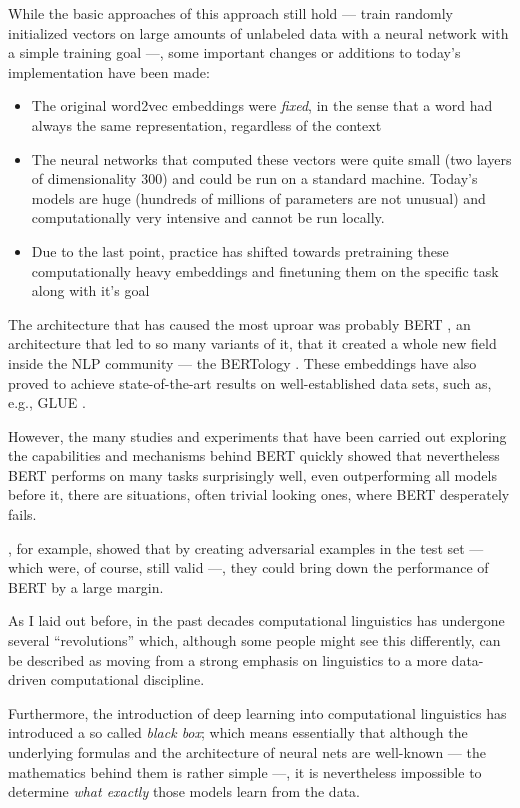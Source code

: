 While the basic approaches of this approach still hold --- train randomly initialized vectors on
large amounts of unlabeled data with a neural network with a simple training goal ---, some important
changes or additions to today's implementation have been made:

\begin{itemize}
	\item The original word2vec embeddings were \emph{fixed}, in the sense that a word had always
					the same representation, regardless of the context
	\item The neural networks that computed these vectors were quite small (two layers of dimensionality
					300) and could be run on a standard machine.
					Today's models are huge (hundreds of millions of parameters are not unusual) and computationally
					very intensive and cannot be run locally.
	\item Due to the last point, practice has shifted towards pretraining these computationally heavy
					embeddings and finetuning them on the specific task along with it's goal
\end{itemize}

The architecture that has caused the most uproar was probably BERT \cite{devlin2018bert},
an architecture that led to so many variants of it, that it created a whole new field inside
the NLP community --- the BERTology \cite{rogers2020primer}.  These embeddings have also
proved to achieve state-of-the-art results on well-established data sets, such as, e.g.,
GLUE \cite{wang2018glue}.

However, the many studies and experiments that have been carried out exploring the capabilities
and mechanisms behind BERT quickly showed that nevertheless BERT performs on many tasks
surprisingly well, even outperforming all models before it, there are situations, often trivial
looking ones, where BERT desperately fails.

\cite{jin2020bert}, for example, showed that by creating adversarial examples in the test set
--- which were, of course, still valid ---, they could bring down the performance of BERT by
a large margin.

As I laid out before, in the past decades computational linguistics has undergone several
``revolutions'' which, although some people might see this differently, can be described as
moving from a strong emphasis on linguistics to a more data-driven computational discipline.

Furthermore, the introduction of deep learning into computational linguistics has introduced a
so called \emph{black box}; which means essentially that although the underlying formulas and the
architecture of neural nets are well-known --- the mathematics behind them is rather simple ---,
it is nevertheless impossible to determine \emph{what exactly} those models learn from the data.

